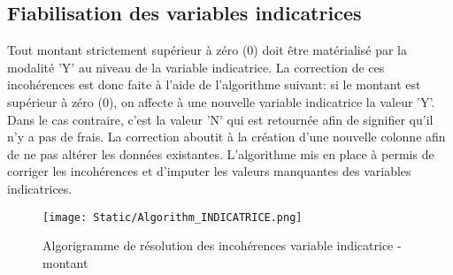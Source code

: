 \subsection{Fiabilisation des variables indicatrices}
Tout montant strictement sup\'erieur \`a z\'ero (0) doit \^etre mat\'erialis\'e par la modalit\'e 'Y' au niveau de la variable indicatrice. La correction de ces incoh\'erences est donc faite \`a l'aide de l'algorithme suivant: si le montant est sup\'erieur \`a  z\'ero (0), on affecte \`a une nouvelle variable indicatrice la valeur 'Y'. Dans le cas contraire, c'est la valeur 'N' qui est retournée afin de signifier qu'il n'y a pas de frais. La correction aboutit \`a la cr\'eation d'une nouvelle colonne afin de ne pas alt\'erer les donn\'ees existantes. L'algorithme mis en place \`a permis de corriger les incoh\'erences et d'imputer les valeurs manquantes des variables indicatrices.
\begin{figure}[H]
    \begin{center}
      \texttt{[image: Static/Algorithm\_INDICATRICE.png]} 
      \end{center}
        \caption{Algorigramme de r\'esolution des incoh\'erences variable indicatrice - montant}  \label{fig:xray}
\end{figure}
